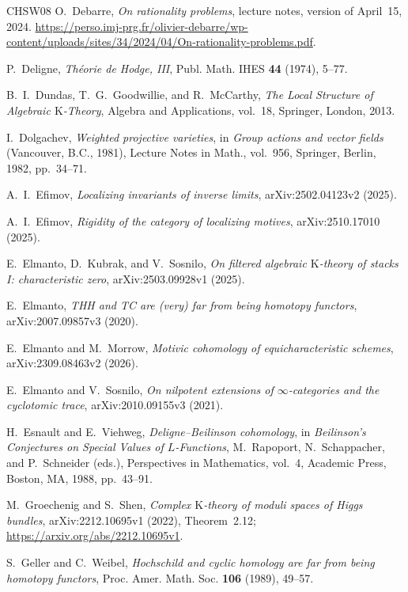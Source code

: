 \documentclass{amsart}
\theoremstyle{plain}
\theoremstyle{definition}
\newcommand{\K}{\mathrm{K}}
\begin{document}
\begin{thebibliography}{CHSW08}
O.~Debarre,
\emph{On rationality problems}, lecture notes, version of April~15, 2024.
\url{https://perso.imj-prg.fr/olivier-debarre/wp-content/uploads/sites/34/2024/04/On-rationality-problems.pdf}.

P.~Deligne, \emph{Th\'eorie de Hodge, III}, Publ. Math. IHES \textbf{44} (1974), 5--77.

B.~I.~Dundas, T.~G.~Goodwillie, and R.~McCarthy,
\emph{The Local Structure of Algebraic $\K$-Theory}, Algebra and Applications, vol.~18, Springer, London, 2013.


I.~Dolgachev,
\emph{Weighted projective varieties}, in \emph{Group actions and vector fields}
(Vancouver, B.C., 1981), Lecture Notes in Math., vol.~956, Springer, Berlin, 1982, pp.~34--71.


A.~I.~Efimov,
\emph{Localizing invariants of inverse limits}, arXiv:2502.04123v2 (2025).

A.~I.~Efimov,
\emph{Rigidity of the category of localizing motives}, arXiv:2510.17010 (2025).

E.~Elmanto, D.~Kubrak, and V.~Sosnilo,
\emph{On filtered algebraic $\K$-theory of stacks I: characteristic zero}, arXiv:2503.09928v1 (2025).

E.~Elmanto,
\emph{THH and TC are (very) far from being homotopy functors}, arXiv:2007.09857v3 (2020).

E.~Elmanto and M.~Morrow,
\emph{Motivic cohomology of equicharacteristic schemes}, arXiv:2309.08463v2 (2026).

E.~Elmanto and V.~Sosnilo,
\emph{On nilpotent extensions of $\infty$-categories and the cyclotomic trace}, arXiv:2010.09155v3 (2021).

H.~Esnault and E.~Viehweg,
\emph{Deligne--Beilinson cohomology}, in \emph{Beilinson's Conjectures on Special Values of $L$-Functions}, M.~Rapoport, N.~Schappacher, and P.~Schneider (eds.), Perspectives in Mathematics, vol.~4, Academic Press, Boston, MA, 1988, pp.~43--91.

M.~Groechenig and S.~Shen,
\emph{Complex $\K$-theory of moduli spaces of Higgs bundles}, arXiv:2212.10695v1 (2022), Theorem~2.12;
\url{https://arxiv.org/abs/2212.10695v1}.

S.~Geller and C.~Weibel,
\emph{Hochschild and cyclic homology are far from being homotopy functors}, Proc. Amer. Math. Soc. \textbf{106} (1989), 49--57.


\end{thebibliography}
\end{document}
